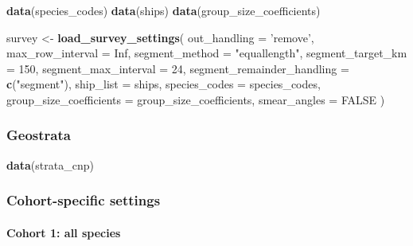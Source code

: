 \documentclass[
]{book}
\newenvironment{Shaded}{\begin{snugshade}}{\end{snugshade}}
\newcommand{\DataTypeTok}[1]{\textcolor[rgb]{0.13,0.29,0.53}{#1}}
\newcommand{\DecValTok}[1]{\textcolor[rgb]{0.00,0.00,0.81}{#1}}
\newcommand{\KeywordTok}[1]{\textcolor[rgb]{0.13,0.29,0.53}{\textbf{#1}}}
\newcommand{\NormalTok}[1]{#1}
\newcommand{\OtherTok}[1]{\textcolor[rgb]{0.56,0.35,0.01}{#1}}
\newcommand{\StringTok}[1]{\textcolor[rgb]{0.31,0.60,0.02}{#1}}
\begin{document}
\begin{Shaded}
\begin{Highlighting}[]
\KeywordTok{data}\NormalTok{(species_codes)}
\KeywordTok{data}\NormalTok{(ships)}
\KeywordTok{data}\NormalTok{(group_size_coefficients)}

\NormalTok{survey <-}\StringTok{ }\KeywordTok{load_survey_settings}\NormalTok{(}
  \DataTypeTok{out_handling =} \StringTok{'remove'}\NormalTok{,}
  \DataTypeTok{max_row_interval =} \OtherTok{Inf}\NormalTok{,}
  \DataTypeTok{segment_method =} \StringTok{"equallength"}\NormalTok{,}
  \DataTypeTok{segment_target_km =} \DecValTok{150}\NormalTok{,}
  \DataTypeTok{segment_max_interval =} \DecValTok{24}\NormalTok{,}
  \DataTypeTok{segment_remainder_handling =} \KeywordTok{c}\NormalTok{(}\StringTok{"segment"}\NormalTok{),}
  \DataTypeTok{ship_list =}\NormalTok{ ships,}
  \DataTypeTok{species_codes =}\NormalTok{ species_codes,}
  \DataTypeTok{group_size_coefficients =}\NormalTok{ group_size_coefficients,}
  \DataTypeTok{smear_angles =} \OtherTok{FALSE}
\NormalTok{)}
\end{Highlighting}
\end{Shaded}

\hypertarget{geostrata-2}{%
\subsubsection*{Geostrata}\label{geostrata-2}}

\begin{Shaded}
\begin{Highlighting}[]
\KeywordTok{data}\NormalTok{(strata_cnp)}
\end{Highlighting}
\end{Shaded}

\hypertarget{cohort-specific-settings-2}{%
\subsubsection*{Cohort-specific settings}\label{cohort-specific-settings-2}}

\hypertarget{cohort-1-all-species-1}{%
\paragraph{Cohort 1: all species}\label{cohort-1-all-species-1}}
\end{document}
